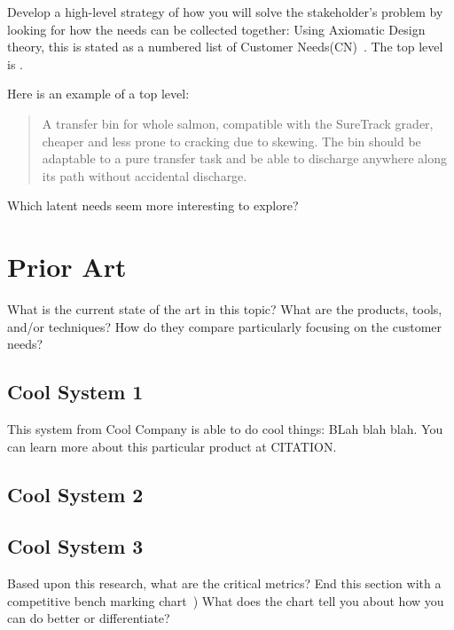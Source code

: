 Develop a high-level strategy of how you will solve the stakeholder's problem by looking for how the needs can be collected together:
Using Axiomatic Design theory, this is stated as a numbered list of Customer Needs(CN)~\cite{suh1990principles}.
The top level is .

Here is an example of a top level:

\begin{quote} \textbf{} A transfer bin for whole salmon, compatible with the SureTrack grader, cheaper and less prone to cracking due to skewing.  
The bin should be adaptable to a pure transfer task and be able to discharge anywhere along its path without
accidental discharge.~\cite{gerhard2016suretrack}
\end{quote}


Which latent needs seem more interesting to explore?

\section{Prior Art}
What is the current state of the art in this topic?
What are the products, tools, and/or techniques?
How do they compare particularly focusing on the customer needs?

\subsection{Cool System 1}
This system from Cool Company is able to do cool things:  BLah blah blah.
You can learn more about this particular product at CITATION.
\subsection{Cool System 2}
\subsection{Cool System 3}

Based upon this research, what are the critical metrics?
End this section with a competitive bench marking chart~\cite[p.104]{ulrich2020product-design-development})
What does the chart tell you about how you can do better or differentiate?

